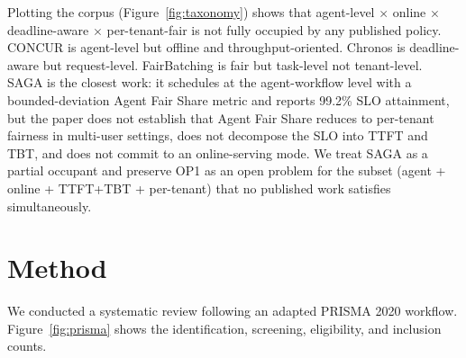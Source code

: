 \documentclass[11pt,letterpaper]{article}
\theoremstyle{definition}
\begin{document}
Plotting the corpus (Figure~\ref{fig:taxonomy}) shows that
agent-level $\times$ online $\times$ deadline-aware $\times$
per-tenant-fair is not fully occupied by any published policy.
CONCUR is agent-level but offline and throughput-oriented. Chronos
is deadline-aware but request-level. FairBatching is fair but
task-level not tenant-level. SAGA
\cite{guo2026saga} is the closest work: it schedules at the
agent-workflow level with a bounded-deviation Agent Fair Share
metric and reports 99.2\% SLO attainment, but the paper does not
establish that Agent Fair Share reduces to per-tenant fairness in
multi-user settings, does not decompose the SLO into TTFT and TBT,
and does not commit to an online-serving mode. We treat SAGA as a
partial occupant and preserve OP1 as an open problem for the
subset (agent + online + TTFT+TBT + per-tenant) that no published
work satisfies simultaneously.

\section{Method}
\label{sec:method}

We conducted a systematic review following an adapted PRISMA 2020
workflow. Figure~\ref{fig:prisma} shows the identification,
screening, eligibility, and inclusion counts.
\end{document}
